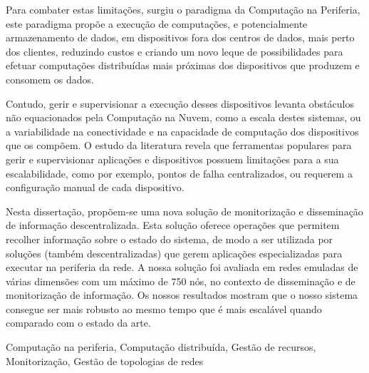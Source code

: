 Para combater estas limitações, surgiu o paradigma da Computação na Periferia, este paradigma propõe a execução de computações, e potencialmente armazenamento de dados, em dispositivos fora dos centros de dados, mais perto dos clientes, reduzindo custos e criando um novo leque de possibilidades para efetuar computações distribuídas mais próximas dos dispositivos que produzem e consomem os dados.

Contudo, gerir e supervisionar a execução desses dispositivos levanta obstáculos não equacionados pela Computação na Nuvem, como a escala destes sistemas, ou a variabilidade na conectividade e na capacidade de computação dos dispositivos que os compõem. O estudo da literatura revela que ferramentas populares para gerir e supervisionar aplicações e dispositivos possuem limitações para a sua escalabilidade, como por exemplo, pontos de falha centralizados, ou requerem a configuração manual de cada dispositivo.

Nesta dissertação, propõem-se uma nova solução de monitorização e disseminação de informação descentralizada. Esta solução oferece operações que permitem recolher informação sobre o estado do sistema, de modo a ser utilizada por soluções (também descentralizadas) que gerem aplicações especializadas para executar na periferia da rede. A nossa solução foi avaliada em redes emuladas de várias dimensões com um máximo de 750 nós, no contexto de disseminação e de monitorização de informação. Os nossos resultados mostram que o nosso sistema consegue ser mais robusto ao mesmo tempo que é mais escalável quando comparado com o estado da arte.

\begin{keywords}
    Computação na periferia, Computação distribuída, Gestão de recursos, Monitorização, Gestão de topologias de redes
\end{keywords}





